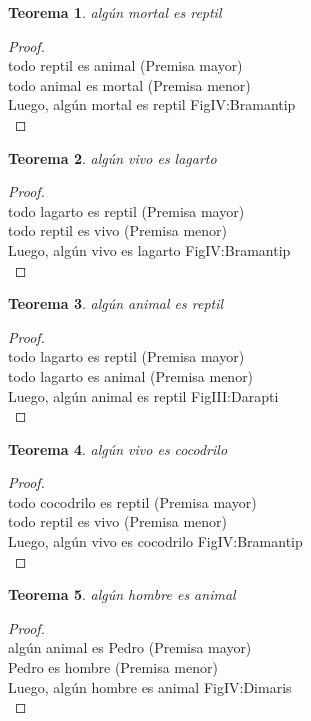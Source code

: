 ﻿\documentclass[12pt]{book}
\newtheorem{theorem}{Teorema}[chapter]
\newtheorem{proof}{Demostración}
\begin{document}
\begin{theorem}
algún mortal es reptil
\label{th: 66}
\end{theorem}\begin{proof}\\todo reptil es animal	 (Premisa mayor) \\todo animal es mortal	 (Premisa menor) \\Luego, algún mortal es reptil	FigIV:Bramantip \\ \end{proof}
\begin{theorem}
algún vivo es lagarto
\label{th: 67}
\end{theorem}\begin{proof}\\todo lagarto es reptil	 (Premisa mayor) \\todo reptil es vivo	 (Premisa menor) \\Luego, algún vivo es lagarto	FigIV:Bramantip \\ \end{proof}
\begin{theorem}
algún animal es reptil
\label{th: 68}
\end{theorem}\begin{proof}\\todo lagarto es reptil	 (Premisa mayor) \\todo lagarto es animal	 (Premisa menor) \\Luego, algún animal es reptil	FigIII:Darapti \\ \end{proof}
\begin{theorem}
algún vivo es cocodrilo
\label{th: 69}
\end{theorem}\begin{proof}\\todo cocodrilo es reptil	 (Premisa mayor) \\todo reptil es vivo	 (Premisa menor) \\Luego, algún vivo es cocodrilo	FigIV:Bramantip \\ \end{proof}
\begin{theorem}
algún hombre es animal
\label{th: 70}
\end{theorem}\begin{proof}\\algún animal es Pedro	 (Premisa mayor) \\Pedro es hombre	 (Premisa menor) \\Luego, algún hombre es animal	FigIV:Dimaris \\ \end{proof}
\end{document}
